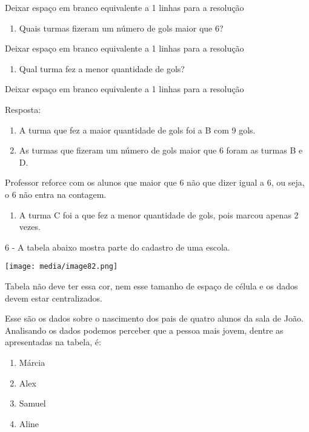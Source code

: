 Deixar espaço em branco equivalente a 1 linhas para a resolução

\begin{enumerate}
\def\labelenumi{\alph{enumi})}
\item
  Quais turmas fizeram um número de gols maior que 6?
\end{enumerate}

Deixar espaço em branco equivalente a 1 linhas para a resolução

\begin{enumerate}
\def\labelenumi{\alph{enumi})}
\item
  Qual turma fez a menor quantidade de gols?
\end{enumerate}

Deixar espaço em branco equivalente a 1 linhas para a resolução

Resposta:

\begin{enumerate}
\def\labelenumi{\alph{enumi})}
\item
  A turma que fez a maior quantidade de gols foi a B com 9 gols.
\item
  As turmas que fizeram um número de gols maior que 6 foram as turmas B
  e D.
\end{enumerate}

Professor reforce com os alunos que maior que 6 não que dizer igual a 6,
ou seja, o 6 não entra na contagem.

\begin{enumerate}
\def\labelenumi{\alph{enumi})}
\item
  A turma C foi a que fez a menor quantidade de gols, pois marcou apenas
  2 vezes.
\end{enumerate}

6 - A tabela abaixo mostra parte do cadastro de uma escola.

\texttt{[image: media/image82.png]}

Tabela não deve ter essa cor, nem esse tamanho de espaço de célula e os
dados devem estar centralizados.

Esse são os dados sobre o nascimento dos pais de quatro alunos da sala
de João. Analisando os dados podemos perceber que a pessoa mais jovem,
dentre as apresentadas na tabela, é:

\begin{enumerate}
\def\labelenumi{\alph{enumi})}
\item
  Márcia
\item
  Alex
\item
  Samuel
\item
  Aline
\end{enumerate}


